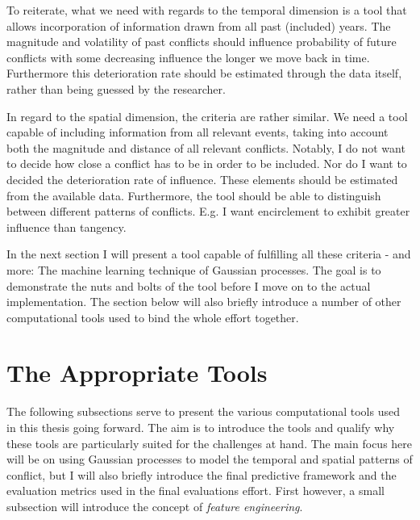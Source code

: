 \documentclass[a4paper]{article}
\begin{document}
To reiterate, what we need with regards to the temporal dimension is a tool that allows incorporation of information drawn from all past (included) years. The magnitude and volatility of past conflicts should influence probability of future conflicts with some decreasing influence the longer we move back in time. Furthermore this deterioration rate should be estimated through the data itself, rather than being guessed by the researcher.\par

In regard to the spatial dimension, the criteria are rather similar. We need a tool capable of including information from all relevant events, taking into account both the magnitude and distance of all relevant conflicts. Notably, I do not want to decide how close a conflict has to be in order to be included. Nor do I want to decided the deterioration rate of influence. These elements should be estimated from the available data. Furthermore, the tool should be able to distinguish between different patterns of conflicts. E.g. I want encirclement to exhibit greater influence than tangency.\par

In the next section I will present a tool capable of fulfilling all these criteria - and more: The machine learning technique of Gaussian processes. The goal is to demonstrate the nuts and bolts of the tool before I move on to the actual implementation. The section below will also briefly introduce a number of other computational tools used to bind the whole effort together.\par


\section{The Appropriate Tools}\label{tools}

The following subsections serve to present the various computational tools used in this thesis going forward. The aim is to introduce the tools and qualify why these tools are particularly suited for the challenges at hand. The main focus here will be on using Gaussian processes to model the temporal and spatial patterns of conflict, but I will also briefly introduce the final predictive framework and the evaluation metrics used in the final evaluations effort. First however, a small subsection will introduce the concept of \emph{feature engineering}.\par
\end{document}
